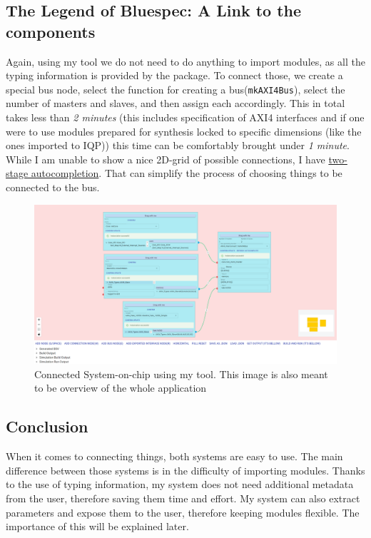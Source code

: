 \documentclass[12pt]{report}
\begin{document}
\subsection{The Legend of Bluespec: A Link to the components} 
Again, using my tool we do not need to do anything to import modules, as all the typing information is provided by the package. To connect those, we create a special bus node, select the function for creating a bus(\verb!mkAXI4Bus!), select the number of masters and slaves, and then assign each accordingly. This in total takes less than \emph{2 minutes} (this includes specification of AXI4 interfaces and if one were to use modules prepared for synthesis locked to specific dimensions (like the ones imported to IQP)) this time can be comfortably brought under \emph{1 minute}. While I am unable to show a nice 2D-grid of possible connections, I have \hyperref[sec:AutocompletionBusNode]{two-stage autocompletion}. That can simplify the process of choosing things to be connected to the bus. 
  
\begin{figure}[H] 
   \label{fig:Overview} 
   \caption{Connected System-on-chip using my tool. This image is also meant to be overview of the whole application} 
   \includegraphics[width=\textwidth]{images/Example2MySolution.png} 
   \centering 
\end{figure} 
\subsection{Conclusion} 
When it comes to connecting things, both systems are easy to use. The main difference between those systems is in the difficulty of importing modules. Thanks to the use of typing information, my system does not need additional metadata from the user, therefore saving them time and effort. My system can also extract parameters and expose them to the user, therefore keeping modules flexible. The importance of this will be explained later. 
\end{document}
